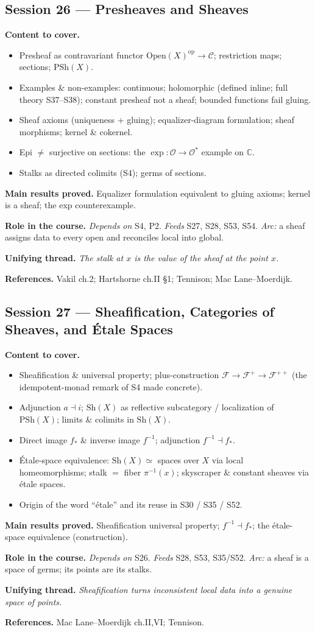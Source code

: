 \documentclass[11pt,a4paper]{article}
\newcommand{\sess}[2]{\subsection[#1. #2]{Session #1 --- #2}}
\newcommand{\chead}{\par\smallskip\noindent\textbf{Content to cover.}}
\newcommand{\proved}[1]{\par\smallskip\noindent\textbf{Main results proved.} #1}
\newcommand{\role}[1]{\par\smallskip\noindent\textbf{Role in the course.} #1}
\newcommand{\thread}[1]{\par\smallskip\noindent\textbf{Unifying thread.} \textit{#1}}
\newcommand{\srefs}[1]{\par\smallskip\noindent\textbf{References.} #1}
\newcommand{\C}{\mathbb{C}}
\begin{document}
	\sess{26}{Presheaves and Sheaves}
	\chead
	\begin{itemize}
		\item Presheaf as contravariant functor $\mathrm{Open}(X)^{\mathrm{op}}\to\mathcal C$; restriction maps; sections; $\mathrm{PSh}(X)$.
		\item Examples \& non-examples: continuous; holomorphic (defined inline; full theory S37--S38); constant presheaf not a sheaf; bounded functions fail gluing.
		\item Sheaf axioms (uniqueness + gluing); equalizer-diagram formulation; sheaf morphisms; kernel \& cokernel.
		\item Epi $\neq$ surjective on sections: the $\exp:\mathcal O\to\mathcal O^*$ example on $\C$.
		\item Stalks as directed colimits (S4); germs of sections.
	\end{itemize}
	\proved{Equalizer formulation equivalent to gluing axioms; kernel is a sheaf; the exp counterexample.}
	\role{\emph{Depends on} S4, P2. \emph{Feeds} S27, S28, S53, S54. \emph{Arc:} a sheaf assigns data to every open and reconciles local into global.}
	\thread{The stalk at $x$ is the value of the sheaf at the point $x$.}
	\srefs{Vakil ch.2; Hartshorne ch.II \S1; Tennison; Mac Lane--Moerdijk.}
	
	\sess{27}{Sheafification, Categories of Sheaves, and \'Etale Spaces}
	\chead
	\begin{itemize}
		\item Sheafification \& universal property; plus-construction $\mathcal F\to\mathcal F^+\to\mathcal F^{++}$ (the idempotent-monad remark of S4 made concrete).
		\item Adjunction $a\dashv i$; $\mathrm{Sh}(X)$ as reflective subcategory / localization of $\mathrm{PSh}(X)$; limits \& colimits in $\mathrm{Sh}(X)$.
		\item Direct image $f_*$ \& inverse image $f^{-1}$; adjunction $f^{-1}\dashv f_*$.
		\item \'Etale-space equivalence: $\mathrm{Sh}(X)\simeq$ spaces over $X$ via local homeomorphisms; stalk $=$ fiber $\pi^{-1}(x)$; skyscraper \& constant sheaves via \'etale spaces.
		\item Origin of the word ``\'etale'' and its reuse in S30 / S35 / S52.
	\end{itemize}
	\proved{Sheafification universal property; $f^{-1}\dashv f_*$; the \'etale-space equivalence (construction).}
	\role{\emph{Depends on} S26. \emph{Feeds} S28, S53, S35/S52. \emph{Arc:} a sheaf is a space of germs; its points are its stalks.}
	\thread{Sheafification turns inconsistent local data into a genuine space of points.}
	\srefs{Mac Lane--Moerdijk ch.II,VI; Tennison.}
	
\end{document}
